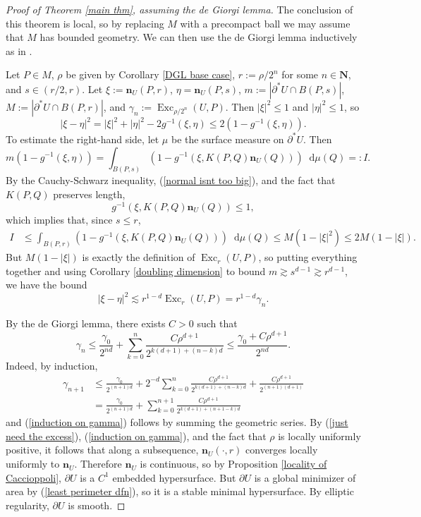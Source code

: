 \documentclass[reqno,11pt]{amsart}
\newcommand{\NN}{\mathbf{N}}
\DeclareMathOperator{\Exc}{Exc}
\newcommand*\dif{\mathop{}\!\mathrm{d}}
\newcommand{\normal}{\mathbf n}
\theoremstyle{definition}
\numberwithin{equation}{section}
\begin{document}
\begin{proof}[Proof of Theorem \ref{main thm}, assuming the de Giorgi lemma]
The conclusion of this theorem is local, so by replacing $M$ with a precompact ball we may assume that $M$ has bounded geometry.
We can then use the de Giorgi lemma inductively as in \cite[Theorem 8.2]{Giusti77}.

Let $P \in M$, $\rho$ be given by Corollary \ref{DGL base case}, $r := \rho/2^n$ for some $n \in \NN$, and $s \in (r/2, r)$.
Let
$\xi := \normal_U(P, r)$, $\eta = \normal_U(P, s)$, $m := |\partial^* U \cap B(P, s)|$, $M := |\partial^* U \cap B(P, r)|$, and $\gamma_n := \Exc_{\rho/2^n}(U, P)$.
Then $|\xi|^2 \leq 1$ and $|\eta|^2 \leq 1$, so
$$|\xi - \eta|^2 = |\xi|^2 + |\eta|^2 - 2 g^{-1}(\xi, \eta) \leq 2(1 - g^{-1}(\xi, \eta)).$$
To estimate the right-hand side, let $\mu$ be the surface measure on $\partial^* U$. Then
$$m(1 - g^{-1}(\xi, \eta)) = \int_{B(P, s)} (1 - g^{-1}(\xi, K(P, Q) \normal_U(Q))) \dif \mu(Q) =: I.$$
By the Cauchy-Schwarz inequality, (\ref{normal isnt too big}), and the fact that $K(P, Q)$ preserves length,
$$g^{-1}(\xi, K(P, Q) \normal_U(Q)) \leq 1,$$
which implies that, since $s \leq r$,
\begin{align*}
I
&\leq \int_{B(P, r)} (1 - g^{-1}(\xi, K(P, Q) \normal_U(Q))) \dif \mu(Q) 
\leq M(1 - |\xi|^2) \leq 2M(1 - |\xi|).
\end{align*}
But $M(1 - |\xi|)$ is exactly the definition of $\Exc_r(U, P)$, so putting everything together and using Corollary \ref{doubling dimension} to bound $m \gtrsim s^{d - 1} \gtrsim r^{d - 1}$, we have the bound
\begin{equation}\label{just need the excess}
|\xi - \eta|^2 \lesssim r^{1 - d} \Exc_r(U, P) = r^{1 - d} \gamma_n.
\end{equation}

By the de Giorgi lemma, there exists $C > 0$ such that
\begin{equation}\label{induction on gamma}
\gamma_n \leq \frac{\gamma_0}{2^{nd}} + \sum_{k=0}^n \frac{C\rho^{d + 1}}{2^{k(d + 1) + (n - k)d}} \leq \frac{\gamma_0 + C\rho^{d + 1}}{2^{nd}}.
\end{equation}
Indeed, by induction,
\begin{align*}
\gamma_{n + 1}
&\leq \frac{\gamma_0}{2^{(n + 1)d}} + 2^{-d} \sum_{k=0}^n \frac{C\rho^{d + 1}}{2^{k(d + 1) + (n - k)d}} + \frac{C\rho^{d + 1}}{2^{(n + 1)(d + 1)}} \\
&= \frac{\gamma_0}{2^{(n + 1)d}} + \sum_{k=0}^{n + 1} \frac{C\rho^{d + 1}}{2^{k(d + 1) + (n + 1 - k)d}}
\end{align*}
and (\ref{induction on gamma}) follows by summing the geometric series.
By (\ref{just need the excess}), (\ref{induction on gamma}), and the fact that $\rho$ is locally uniformly positive, it follows that along a subsequence, $\normal_U(\cdot, r)$ converges locally uniformly to $\normal_U$.
Therefore $\normal_U$ is continuous, so by Proposition \ref{locality of Caccioppoli}, $\partial U$ is a $C^1$ embedded hypersurface.
But $\partial U$ is a global minimizer of area by (\ref{least perimeter dfn}), so it is a stable minimal hypersurface.
By elliptic regularity, $\partial U$ is smooth.
\end{proof}
\end{document}
